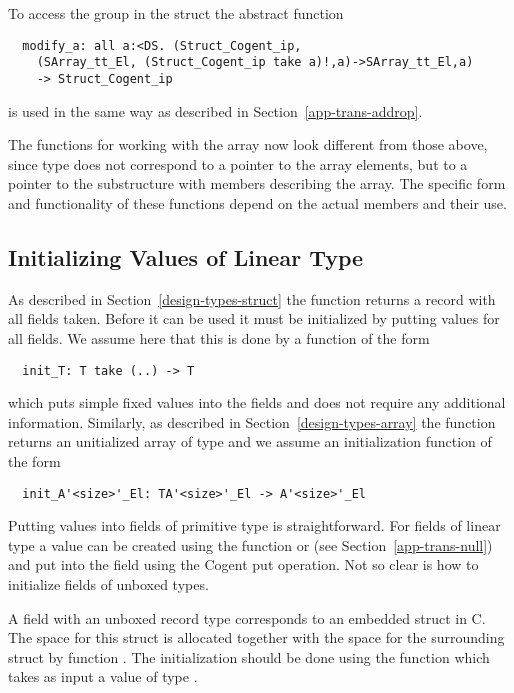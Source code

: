 To access the group in the struct the abstract function
\begin{verbatim}
  modify_a: all a:<DS. (Struct_Cogent_ip,
    (SArray_tt_El, (Struct_Cogent_ip take a)!,a)->SArray_tt_El,a)
    -> Struct_Cogent_ip
\end{verbatim}
is used in the same way as described in Section~\ref{app-trans-addrop}.

The functions for working with the array now look different from those above, since type 
does not correspond to a pointer to the array elements, but to a pointer to the substructure with members describing
the array. The specific form and functionality of these functions depend on the actual members and their use.

\subsection{Initializing Values of Linear Type}
\label{app-trans-init}

As described in Section~\ref{design-types-struct} the function  returns a record with all fields taken.
Before it can be used it must be initialized by putting values for all fields. We assume here that this is done by a 
function of the form
\begin{verbatim}
  init_T: T take (..) -> T
\end{verbatim}
which puts simple fixed values into the fields and does not require any additional information.
Similarly, as described in Section~\ref{design-types-array} the function  returns an 
unitialized array of type  and we assume an initialization function of the form
\begin{verbatim}
  init_A'<size>'_El: TA'<size>'_El -> A'<size>'_El
\end{verbatim}

Putting values into fields of primitive type is straightforward. For fields of linear type  a value can be created 
using the function  or  (see Section~\ref{app-trans-null}) and put into the field using the
Cogent put operation. Not so clear is how to initialize fields of unboxed types.

A field  with an unboxed record type  corresponds to an embedded struct in C. The space for this struct is allocated together
with the space for the surrounding struct by function . The initialization should be done using the 
function  which takes as input a value of type . 

